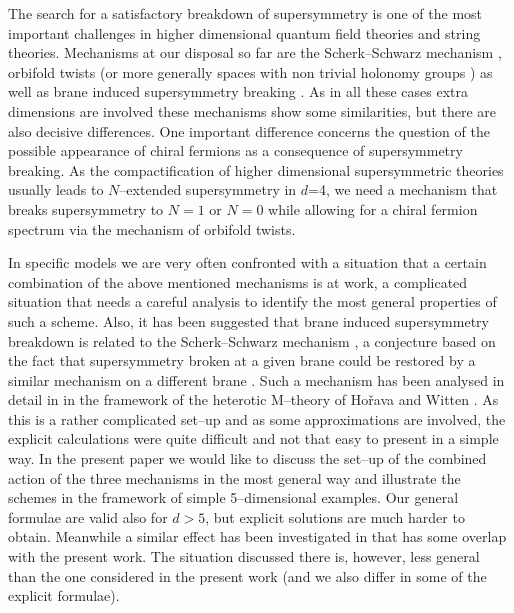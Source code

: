 \documentclass[a4paper,12pt]{article}
\begin{document}
The search for a satisfactory breakdown of supersymmetry is one of the
most important challenges in higher dimensional quantum field theories
and string theories. Mechanisms at our disposal so far are the
Scherk--Schwarz mechanism \cite{Scherk:1978ta,Scherk:1979zr}, orbifold
twists \cite{Rohm:aq,Dixon:jw,Dixon:1986jc} (or more generally spaces
with non trivial holonomy groups \cite{Candelas:en}) as well as brane
induced supersymmetry breaking \cite{Horava:1996vs,Nilles:1997cm}. 
As in all these cases extra dimensions are involved these mechanisms
show some similarities, but there are also decisive differences. One
important difference concerns the question of the possible appearance
of chiral fermions as a consequence of supersymmetry breaking. As the
compactification of higher dimensional supersymmetric theories usually
leads to $N$--extended supersymmetry in $d$=4, we need a mechanism
that breaks supersymmetry to $N=1$ or $N=0$ while allowing for a
chiral fermion spectrum via the mechanism of orbifold twists.


In specific models we are very often confronted with a situation that
a certain combination of the above mentioned mechanisms is at work, a
complicated situation that needs a careful analysis to identify the
most general properties of such a scheme. Also, it has been suggested
that brane induced supersymmetry breakdown is related to the
Scherk--Schwarz mechanism \cite{Antoniadis:1997ic,Antoniadis:1997xk},  
a conjecture based on the fact that supersymmetry broken at a given
brane could be restored by a similar mechanism on a different brane
\cite{Horava:1996vs,Nilles:1998sx,Meissner:1999ja}. Such a 
mechanism has been analysed in detail in \cite{Meissner:1999ja} 
in the framework of the heterotic M--theory of Ho\v rava and
Witten \cite{Horava:1996ma}. As this is a rather complicated set--up
and as some approximations are involved, the explicit calculations
were quite difficult and not that easy to present in a simple way. In
the present paper we would like to discuss the set--up of the combined
action of the three mechanisms in the most general way and illustrate
the schemes in the framework of simple 5--dimensional examples. Our
general formulae are valid also for $d>5$, but explicit solutions are
much harder to obtain. Meanwhile a similar effect has been
investigated in \cite{Bagger:2001qi,Bagger:2001ep} that has some
overlap with the present work. The situation discussed there is,
however, less general than the one considered in the present work 
(and we also differ in some of the explicit formulae).
\end{document}
